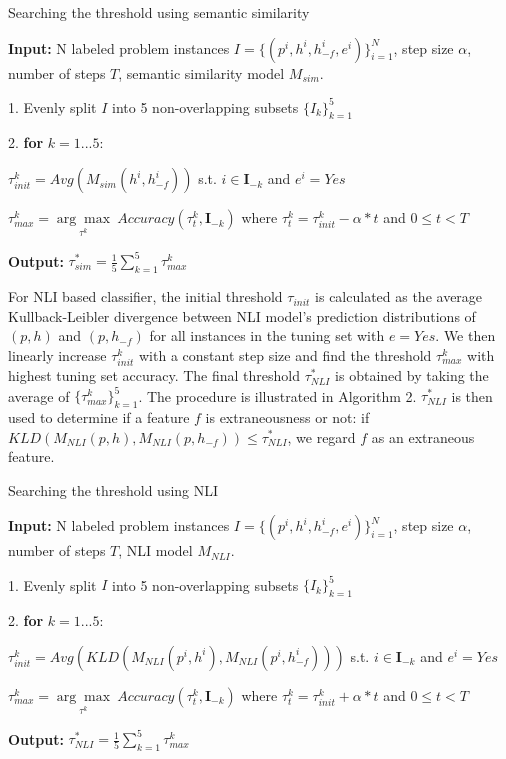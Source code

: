 \begin{algorithm}[th]
\caption{Searching the threshold using semantic similarity}
\textbf{Input:} N labeled problem instances $I=\{(p^i, h^i, h_{-f}^i, e^i)\}_{i=1}^N$, step size $\alpha$, number of steps $T$, semantic similarity model $M_{sim}$.

1. Evenly split $I$ into 5 non-overlapping subsets $\{I_k\}_{k=1}^5$

2. \textbf{for} $k=1...5$:

    \quad \quad $\tau_{init}^k=Avg(M_{sim}(h^i, h_{-f}^i))$ s.t. $i\in \bm{I}_{-k}$ and $e^i=Yes$

    \quad \quad $\tau_{max}^k=\underset{\tau^k}{\arg\max}\ Accuracy(\tau_t^k, \bm{I}_{-k})$ where $\tau_t^k=\tau_{init}^k-\alpha*t$ and $0\leq t< T$

\textbf{Output:} $\tau_{sim}^*=\frac{1}{5}\sum_{k=1}^{5}\tau_{max}^{k}$
\end{algorithm}

For NLI based classifier, the initial threshold $\tau_{init}$ is calculated as the average Kullback-Leibler divergence between NLI model's prediction distributions of 
$(p, h)$ and $(p, h_{-f})$ for all instances in the tuning set with $e=Yes$. We then linearly increase $\tau_{init}^k$ with a constant step size and find the threshold $\tau_{max}^k$ 
with highest tuning set accuracy. The final threshold $\tau_{NLI}^*$ is obtained by taking the average of $\{\tau_{max}^k\}_{k=1}^5$. 
The procedure is illustrated in Algorithm 2. $\tau_{NLI}^*$ is then used to determine if a feature $f$ is extraneousness or not: if $KLD(M_{NLI}(p,h), M_{NLI}(p,h_{-f})) \leq \tau_{NLI}^*$, we regard $f$ as an extraneous feature.



\begin{algorithm}[th]
\caption{Searching the threshold using NLI}
\textbf{Input:} N labeled problem instances $I=\{(p^i, h^i, h_{-f}^i, e^i)\}_{i=1}^N$, step size $\alpha$, number of steps $T$, NLI model $M_{NLI}$.

1. Evenly split $I$ into 5 non-overlapping subsets $\{I_k\}_{k=1}^5$

2. \textbf{for} $k=1...5$:

    \quad \quad $\tau_{init}^k=Avg(KLD(M_{NLI}(p^i,h^i), M_{NLI}(p^i,h_{-f}^i)))$ s.t. $i\in \bm{I}_{-k}$ and $e^i=Yes$

    \quad \quad $\tau_{max}^k=\underset{\tau^k}{\arg\max}\ Accuracy(\tau_t^k, \bm{I}_{-k})$ where $\tau_t^k=\tau_{init}^k+\alpha*t$ and $0\leq t< T$

\textbf{Output:} $\tau_{NLI}^*=\frac{1}{5}\sum_{k=1}^{5}\tau_{max}^{k}$
\end{algorithm}

